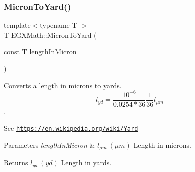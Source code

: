 \subsubsection{\texorpdfstring{Micron\+To\+Yard()}{MicronToYard()}}
{\footnotesize\ttfamily template$<$typename T $>$ \\
T E\+G\+X\+Math\+::\+Micron\+To\+Yard (\begin{DoxyParamCaption}\item[{const T}]{length\+In\+Micron }\end{DoxyParamCaption})}



Converts a length in microns to yards. \[ l_{yd}= \frac{10^{-6}}{0.0254 * 36} \frac{1}{36} l_{\mu m} \]. 

See \href{https://en.wikipedia.org/wiki/Yard}{\tt https\+://en.\+wikipedia.\+org/wiki/\+Yard} 
\begin{DoxyParams}{Parameters}
{\em length\+In\+Micron} & $ l_{\mu m}\ (\mu m)$ Length in microns. \\
\hline
\end{DoxyParams}
\begin{DoxyReturn}{Returns}
$ l_{yd}\ (yd)$ Length in yards. 
\end{DoxyReturn}
